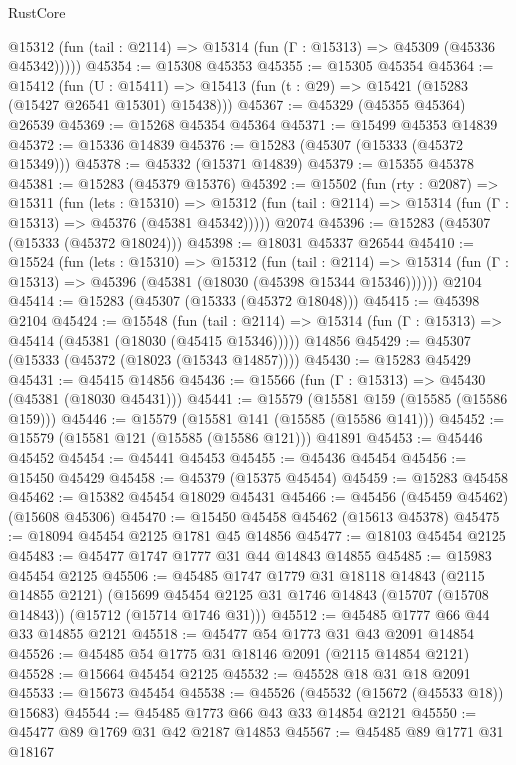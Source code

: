 \begin{lexlean}{RustCore}
\begin{coremodule}
      @15312 (fun (tail : @2114) => @15314 (fun (Γ : @15313) => @45309 (@45336 @45342)))))
@45354 := @15308 @45353
@45355 := @15305 @45354
@45364 := @15412
    (fun (U : @15411) => @15413 (fun (t : @29) => @15421 (@15283 (@15427 @26541 @15301) @15438)))
@45367 := @45329 (@45355 @45364) @26539
@45369 := @15268 @45354 @45364
@45371 := @15499 @45353 @14839
@45372 := @15336 @14839
@45376 := @15283 (@45307 (@15333 (@45372 @15349)))
@45378 := @45332 (@15371 @14839)
@45379 := @15355 @45378
@45381 := @15283 (@45379 @15376)
@45392 := @15502
    (fun (rty : @2087) =>
    @15311
      (fun (lets : @15310) =>
      @15312 (fun (tail : @2114) => @15314 (fun (Γ : @15313) => @45376 (@45381 @45342)))))
    @2074
@45396 := @15283 (@45307 (@15333 (@45372 @18024)))
@45398 := @18031 @45337 @26544
@45410 := @15524
    (fun (lets : @15310) =>
    @15312
      (fun (tail : @2114) =>
      @15314 (fun (Γ : @15313) => @45396 (@45381 (@18030 (@45398 @15344 @15346))))))
    @2104
@45414 := @15283 (@45307 (@15333 (@45372 @18048)))
@45415 := @45398 @2104
@45424 := @15548
    (fun (tail : @2114) => @15314 (fun (Γ : @15313) => @45414 (@45381 (@18030 (@45415 @15346)))))
    @14856
@45429 := @45307 (@15333 (@45372 (@18023 (@15343 @14857))))
@45430 := @15283 @45429
@45431 := @45415 @14856
@45436 := @15566 (fun (Γ : @15313) => @45430 (@45381 (@18030 @45431)))
@45441 := @15579 (@15581 @159 (@15585 (@15586 @159)))
@45446 := @15579 (@15581 @141 (@15585 (@15586 @141)))
@45452 := @15579 (@15581 @121 (@15585 (@15586 @121))) @41891
@45453 := @45446 @45452
@45454 := @45441 @45453
@45455 := @45436 @45454
@45456 := @15450 @45429
@45458 := @45379 (@15375 @45454)
@45459 := @15283 @45458
@45462 := @15382 @45454 @18029 @45431
@45466 := @45456 (@45459 @45462) (@15608 @45306)
@45470 := @15450 @45458 @45462 (@15613 @45378)
@45475 := @18094 @45454 @2125 @1781 @45 @14856
@45477 := @18103 @45454 @2125
@45483 := @45477 @1747 @1777 @31 @44 @14843 @14855
@45485 := @15983 @45454 @2125
@45506 := @45485
    @1747
    @1779
    @31
    @18118
    @14843
    (@2115 @14855 @2121)
    (@15699 @45454 @2125 @31 @1746 @14843 (@15707 (@15708 @14843)) (@15712 (@15714 @1746 @31)))
@45512 := @45485 @1777 @66 @44 @33 @14855 @2121
@45518 := @45477 @54 @1773 @31 @43 @2091 @14854
@45526 := @45485 @54 @1775 @31 @18146 @2091 (@2115 @14854 @2121)
@45528 := @15664 @45454 @2125
@45532 := @45528 @18 @31 @18 @2091
@45533 := @15673 @45454
@45538 := @45526 (@45532 (@15672 (@45533 @18)) @15683)
@45544 := @45485 @1773 @66 @43 @33 @14854 @2121
@45550 := @45477 @89 @1769 @31 @42 @2187 @14853
@45567 := @45485
    @89
    @1771
    @31
    @18167

\end{coremodule}
\end{lexlean}

